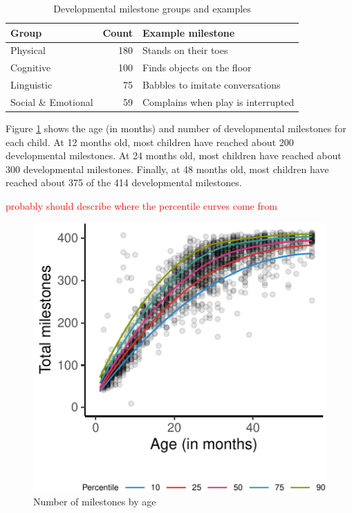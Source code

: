 \documentclass[10pt, letterpaper]{article}
\newenvironment{CodeChunk}{}{}
\begin{document}
\begin{CodeChunk}
\begin{table}[!h]

\caption{\label{tab:examples}Developmental milestone groups and examples}
\centering
\fontsize{8}{10}\selectfont
\begin{tabular}[t]{l|r|l}
\hline
Group & Count & Example milestone\\
\hline
Physical & 180 & Stands on their toes\\
\hline
Cognitive & 100 & Finds objects on the floor\\
\hline
Linguistic & 75 & Babbles to imitate conversations\\
\hline
Social \& Emotional & 59 & Complains when play is interrupted\\
\hline
\end{tabular}
\end{table}

\end{CodeChunk}

Figure \ref{fig:growth} shows the age (in months) and number of
developmental milestones for each child. At 12 months old, most children
have reached about 200 developmental milestones. At 24 months old, most
children have reached about 300 developmental milestones. Finally, at 48
months old, most children have reached about 375 of the 414
developmental milestones.

\textcolor{red}{probably should describe where}
\textcolor{red}{the percentile curves come from}

\begin{CodeChunk}
\begin{figure}[tb]
\includegraphics{figs/growth-1} \caption[Number of milestones by age]{Number of milestones by age}\label{fig:growth}
\end{figure}
\end{CodeChunk}
\end{document}
